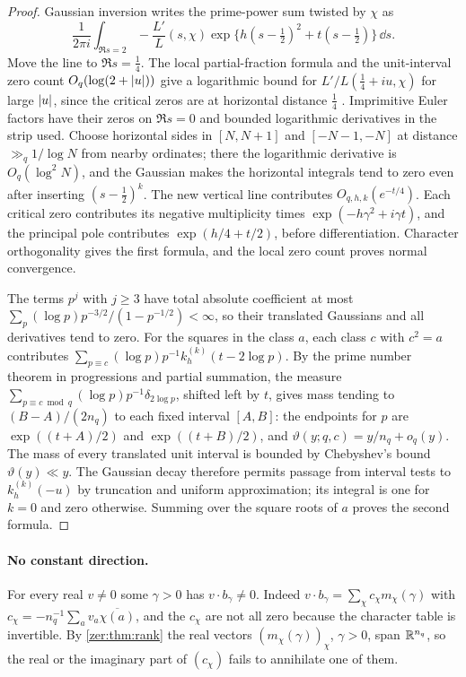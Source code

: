 \begin{proof}
Gaussian inversion writes the prime-power sum twisted by $\chi$ as
\[
 \frac1{2\pi i}\int_{\Re s=2}-\frac{L'}{L}(s,\chi)\exp\bigl\{h(s-\tfrac12)^2+t(s-\tfrac12)\bigr\}\,\dd s .
\]
Move the line to $\Re s=\tfrac14$. The local partial-fraction formula and the unit-interval
zero count $O_q(\log(2+\lvert u\rvert))$ give a logarithmic bound for $L'/L(\tfrac14+iu,\chi)$ for large
$\lvert u\rvert$, since the critical zeros are at horizontal distance $\tfrac14$
\cite{Koukoulopoulos2019Distribution,Davenport2000Multiplicative}. Imprimitive Euler factors
have their zeros on $\Re s=0$ and bounded logarithmic derivatives in the strip used. Choose
horizontal sides in $[N,N+1]$ and $[-N-1,-N]$ at distance $\gg_q1/\log N$ from nearby ordinates;
there the logarithmic derivative is $O_q(\log^2N)$, and the Gaussian makes the horizontal
integrals tend to zero even after inserting $(s-\tfrac12)^k$. The new vertical line contributes
$O_{q,h,k}(e^{-t/4})$. Each critical zero contributes its negative multiplicity times
$\exp(-h\gamma^2+i\gamma t)$, and the principal pole contributes $\exp(h/4+t/2)$, before
differentiation. Character orthogonality gives the first formula, and the local zero count
proves normal convergence.

The terms $p^j$ with $j\ge3$ have total absolute coefficient at most
$\sum_p(\log p)p^{-3/2}/(1-p^{-1/2})<\infty$, so their translated Gaussians and all derivatives
tend to zero. For the squares in the class $a$, each class $c$ with $c^2=a$ contributes
$\sum_{p\equiv c}(\log p)p^{-1}k_h^{(k)}(t-2\log p)$. By the prime number theorem in progressions
and partial summation, the measure $\sum_{p\equiv c\bmod q}(\log p)p^{-1}\delta_{2\log p}$, shifted
left by $t$, gives mass tending to $(B-A)/(2n_q)$ to each fixed interval $[A,B]$: the endpoints
for $p$ are $\exp((t+A)/2)$ and $\exp((t+B)/2)$, and $\vartheta(y;q,c)=y/n_q+o_q(y)$. The mass of
every translated unit interval is bounded by Chebyshev's bound $\vartheta(y)\ll y$. The Gaussian
decay therefore permits passage from interval tests to $k_h^{(k)}(-u)$ by truncation and uniform
approximation; its integral is one for $k=0$ and zero otherwise. Summing over the square roots
of $a$ proves the second formula.
\end{proof}

\paragraph{No constant direction.}
For every real $v\ne0$ some $\gamma>0$ has $v\cdot b_\gamma\ne0$. Indeed
$v\cdot b_\gamma=\sum_\chi c_\chi m_\chi(\gamma)$ with $c_\chi=-n_q^{-1}\sum_av_a\overline{\chi(a)}$,
and the $c_\chi$ are not all zero because the character table is invertible. By
\cref{zer:thm:rank} the real vectors $(m_\chi(\gamma))_\chi$, $\gamma>0$, span $\mathbb{R}^{n_q}$, so the
real or the imaginary part of $(c_\chi)$ fails to annihilate one of them.

